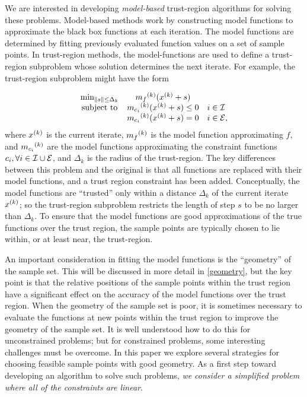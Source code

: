 We are interested in developing {\em model-based} trust-region algorithms for solving these problems.
Model-based methods work by constructing model functions to approximate the black box functions at each iteration.
The model functions are determined by fitting previously evaluated function values on a set of sample points.
In trust-region methods, the model-functions are used to define a trust-region subproblem whose solution determines the next iterate.
For example, the trust-region subproblem might have the form

\[ \begin{array}{ccl} \min_{\| s \| \le \Delta_k}
 & {{m}_f}^{(k)} ({x}^{(k)}+s) \\
\mbox{subject to} & {{m}_{c_i}}^{(k)}({x}^{(k)} + s) \le 0 & i \in \mathcal{I} \\
& {{m}_{c_i}}^{(k)}({x}^{(k)} + s) = 0 & i \in \mathcal{E},
\end{array}
\]
where ${x}^{(k)}$ is the current iterate, ${{m}_f}^{(k)}$ is the model function approximating $f$,  and ${{m}_{c_i}}^{(k)}$ are the model functions approximating the constraint functions $c_i, \forall i \in \mathcal{I} \cup \mathcal{E}$, and $\Delta_k$ is the radius of the trust-region.
The key differences between this problem and the original is that all functions are replaced with their model functions, and a trust region constraint has been added.
Conceptually, the model functions are ``trusted'' only within a distance $\Delta_k$ of the current iterate ${x}^{(k)}$; so the trust-region subproblem restricts the length of step $s$ to be no larger than $\Delta_k$.
To ensure that the model functions are good approximations of the true functions over the trust region, the sample points are typically chosen to lie within, or at least near, the trust-region.


An important consideration in fitting the model functions is the ``geometry'' of the sample set.
This will be discussed in more detail in \cref{geometry}, but the key point is that the relative positions of the sample points within the trust region have a significant effect on the accuracy of the model functions over the trust region.
When the geometry of the sample set is poor, it is sometimes necessary to evaluate the functions at new points within the trust region to improve the geometry of the sample set.
It is well understood how to do this for unconstrained problems; but for constrained problems, some interesting challenges must be overcome.
In this paper we explore several strategies for choosing feasible sample points with good geometry.
As a first step toward developing an algorithm to solve such problems, \emph{we consider a simplified problem where all of the constraints are linear}.

